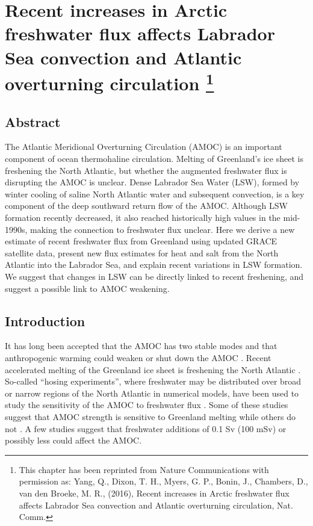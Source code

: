 \chapter[Recent increases in Arctic freshwater flux affects Labrador Sea convection and Atlantic overturning circulation]{Recent increases in Arctic freshwater flux affects Labrador Sea convection and Atlantic overturning circulation \footnote{This chapter has been reprinted from Nature Communications with permission as: Yang, Q., Dixon, T. H., Myers, G. P., Bonin, J., Chambers, D., van den Broeke, M. R., (2016), Recent increases in Arctic freshwater flux affects Labrador Sea convection and Atlantic overturning circulation, Nat. Comm.}}

\section{Abstract}
The Atlantic Meridional Overturning Circulation (AMOC) is an important component of ocean thermohaline circulation.  Melting of Greenland’s ice sheet is freshening the North Atlantic, but whether the augmented freshwater flux is disrupting the AMOC is unclear.  Dense Labrador Sea Water (LSW), formed by winter cooling of saline North Atlantic water and subsequent convection, is a key component of the deep southward return flow of the AMOC.  Although LSW formation recently decreased, it also reached historically high values in the mid-1990s, making the connection to freshwater flux unclear.   Here we derive a new estimate of recent freshwater flux from Greenland using updated GRACE satellite data, present new flux estimates for heat and salt from the North Atlantic into the Labrador Sea, and explain recent variations in LSW formation.  We suggest that changes in LSW can be directly linked to recent freshening, and suggest a possible link to AMOC weakening.

\section{Introduction}
It has long been accepted that the AMOC has two stable modes \cite[]{stommel1961,rooth1982,broecker1985} and that anthropogenic warming could weaken or shut down the AMOC \cite[]{broecker1987,wood1999}.  Recent accelerated melting of the Greenland ice sheet is freshening the North Atlantic \cite[]{jiang2010,rignot2011,enderlin2014,velicogna2014regional,yang2013}.  So-called “hosing experiments”, where freshwater may be distributed over broad or narrow regions of the North Atlantic in numerical models, have been used to study the sensitivity of the AMOC to freshwater flux \cite{fichefet2003,jungclaus2006,stouffer2006,hu2011,swingedow2013,ridley2005,brunnabend2015}.  Some of these studies suggest that AMOC strength is sensitive to Greenland melting \cite[]{fichefet2003,brunnabend2015} while others do not \cite[]{jungclaus2006,hu2011,ridley2005}.  A few studies suggest that freshwater additions of 0.1 Sv (100 mSv) \cite[]{rahmstorf1995,rahmstorf2005,hawkins2011} or possibly less \cite[]{fichefet2003,brunnabend2015}could affect the AMOC. 

